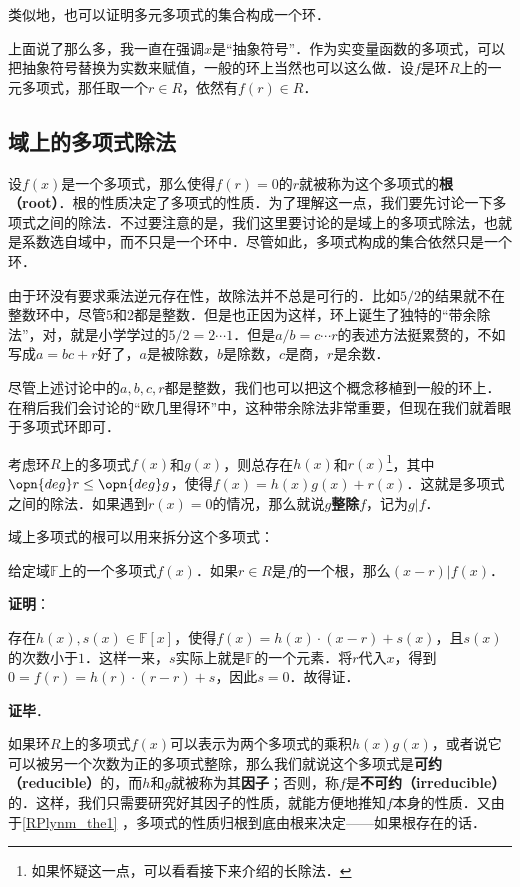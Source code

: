 类似地，也可以证明多元多项式的集合构成一个环．

上面说了那么多，我一直在强调$x$是“抽象符号”．作为实变量函数的多项式，可以把抽象符号替换为实数来赋值，一般的环上当然也可以这么做．设$f$是环$R$上的一元多项式，那任取一个$r\in R$，依然有$f(r)\in R$．




\subsection{域上的多项式除法}

设$f(x)$是一个多项式，那么使得$f(r)=0$的$r$就被称为这个多项式的\textbf{根（root）}．根的性质决定了多项式的性质．为了理解这一点，我们要先讨论一下多项式之间的除法．不过要注意的是，我们这里要讨论的是域上的多项式除法，也就是系数选自域中，而不只是一个环中．尽管如此，多项式构成的集合依然只是一个环．

由于环没有要求乘法逆元存在性，故除法并不总是可行的．比如$5/2$的结果就不在整数环中，尽管$5$和$2$都是整数．但是也正因为这样，环上诞生了独特的“带余除法”，对，就是小学学过的$5/2=2\cdots 1$．但是$a/b=c\cdots r$的表述方法挺累赘的，不如写成$a=bc+r$好了，$a$是被除数，$b$是除数，$c$是商，$r$是余数．

尽管上述讨论中的$a, b, c, r$都是整数，我们也可以把这个概念移植到一般的环上．在稍后我们会讨论的“欧几里得环”中，这种带余除法非常重要，但现在我们就着眼于多项式环即可．

考虑环$R$上的多项式$f(x)$和$g(x)$，则总存在$h(x)$和$r(x)$\footnote{如果怀疑这一点，可以看看接下来介绍的长除法．}，其中$\opn{deg}r\leq\opn{deg}g$，使得$f(x)=h(x)g(x)+r(x)$．这就是多项式之间的除法．如果遇到$r(x)=0$的情况，那么就说$g$\textbf{整除}$f$，记为$g|f$．

域上多项式的根可以用来拆分这个多项式：

\begin{theorem}{}\label{RPlynm_the1}
给定域$\mathbb{F}$上的一个多项式$f(x)$．如果$r\in R$是$f$的一个根，那么$(x-r)|f(x)$．
\end{theorem}

\textbf{证明}：

存在$h(x), s(x)\in\mathbb{F}[x]$，使得$f(x)=h(x)\cdot(x-r)+s(x)$，且$s(x)$的次数小于$1$．这样一来，$s$实际上就是$\mathbb{F}$的一个元素．将$r$代入$x$，得到$0=f(r)=h(r)\cdot(r-r)+s$，因此$s=0$．故得证．

\textbf{证毕}．

如果环$R$上的多项式$f(x)$可以表示为两个多项式的乘积$h(x)g(x)$，或者说它可以被另一个次数为正的多项式整除，那么我们就说这个多项式是\textbf{可约（reducible）}的，而$h$和$g$就被称为其\textbf{因子}；否则，称$f$是\textbf{不可约（irreducible）}的．这样，我们只需要研究好其因子的性质，就能方便地推知$f$本身的性质．又由于\autoref{RPlynm_the1} ，多项式的性质归根到底由根来决定——如果根存在的话．

